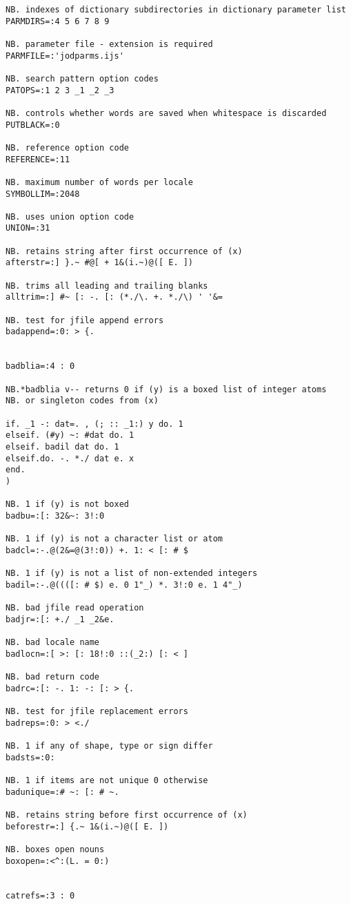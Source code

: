 \begin{lstlisting}[frame=single,framerule=0pt,basicstyle=\ttfamily\tiny]
NB. indexes of dictionary subdirectories in dictionary parameter list
PARMDIRS=:4 5 6 7 8 9

NB. parameter file - extension is required
PARMFILE=:'jodparms.ijs'

NB. search pattern option codes
PATOPS=:1 2 3 _1 _2 _3

NB. controls whether words are saved when whitespace is discarded
PUTBLACK=:0

NB. reference option code
REFERENCE=:11

NB. maximum number of words per locale
SYMBOLLIM=:2048

NB. uses union option code
UNION=:31

NB. retains string after first occurrence of (x)
afterstr=:] }.~ #@[ + 1&(i.~)@([ E. ])

NB. trims all leading and trailing blanks
alltrim=:] #~ [: -. [: (*./\. +. *./\) ' '&=

NB. test for jfile append errors
badappend=:0: > {.


badblia=:4 : 0

NB.*badblia v-- returns 0 if (y) is a boxed list of integer atoms
NB. or singleton codes from (x)

if. _1 -: dat=. , (; :: _1:) y do. 1
elseif. (#y) ~: #dat do. 1
elseif. badil dat do. 1
elseif.do. -. *./ dat e. x
end.
)

NB. 1 if (y) is not boxed
badbu=:[: 32&~: 3!:0

NB. 1 if (y) is not a character list or atom
badcl=:-.@(2&=@(3!:0)) +. 1: < [: # $

NB. 1 if (y) is not a list of non-extended integers
badil=:-.@((([: # $) e. 0 1"_) *. 3!:0 e. 1 4"_)

NB. bad jfile read operation
badjr=:[: +./ _1 _2&e.

NB. bad locale name
badlocn=:[ >: [: 18!:0 ::(_2:) [: < ]

NB. bad return code
badrc=:[: -. 1: -: [: > {.

NB. test for jfile replacement errors
badreps=:0: > <./

NB. 1 if any of shape, type or sign differ
badsts=:0:

NB. 1 if items are not unique 0 otherwise
badunique=:# ~: [: # ~.

NB. retains string before first occurrence of (x)
beforestr=:] {.~ 1&(i.~)@([ E. ])

NB. boxes open nouns
boxopen=:<^:(L. = 0:)


catrefs=:3 : 0


\end{lstlisting}
